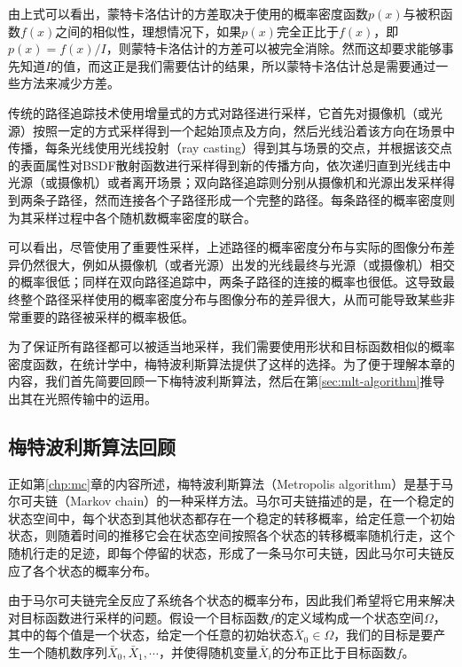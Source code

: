 \noindent 由上式可以看出，蒙特卡洛估计的方差取决于使用的概率密度函数$p(x)$与被积函数$f(x)$之间的相似性，理想情况下，如果$p(x)$完全正比于$f(x)$，即$p(x)=f(x)/I$，则蒙特卡洛估计的方差可以被完全消除。然而这却要求能够事先知道$I$的值，而这正是我们需要估计的结果，所以蒙特卡洛估计总是需要通过一些方法来减少方差。

传统的路径追踪技术使用增量式的方式对路径进行采样，它首先对摄像机（或光源）按照一定的方式采样得到一个起始顶点及方向，然后光线沿着该方向在场景中传播，每条光线使用光线投射（ray casting）得到其与场景的交点，并根据该交点的表面属性对BSDF散射函数进行采样得到新的传播方向，依次递归直到光线击中光源（或摄像机）或者离开场景；双向路径追踪则分别从摄像机和光源出发采样得到两条子路径，然而连接各个子路径形成一个完整的路径。每条路径的概率密度则为其采样过程中各个随机数概率密度的联合。

可以看出，尽管使用了重要性采样，上述路径的概率密度分布与实际的图像分布差异仍然很大，例如从摄像机（或者光源）出发的光线最终与光源（或摄像机）相交的概率很低；同样在双向路径追踪中，两条子路径的连接的概率也很低。这导致最终整个路径采样使用的概率密度分布与图像分布的差异很大，从而可能导致某些非常重要的路径被采样的概率极低。

为了保证所有路径都可以被适当地采样，我们需要使用形状和目标函数相似的概率密度函数，在统计学中，梅特波利斯算法提供了这样的选择。为了便于理解本章的内容，我们首先简要回顾一下梅特波利斯算法，然后在第\ref{sec:mlt-algorithm}推导出其在光照传输中的运用。



\subsection{梅特波利斯算法回顾}
正如第\ref{chp:mc}章的内容所述，梅特波利斯算法（Metropolis algorithm）是基于马尔可夫链（Markov chain）的一种采样方法。马尔可夫链描述的是，在一个稳定的状态空间中，每个状态到其他状态都存在一个稳定的转移概率，给定任意一个初始状态，则随着时间的推移它会在状态空间按照各个状态的转移概率随机行走，这个随机行走的足迹，即每个停留的状态，形成了一条马尔可夫链，因此马尔可夫链反应了各个状态的概率分布。

由于马尔可夫链完全反应了系统各个状态的概率分布，因此我们希望将它用来解决对目标函数进行采样的问题。假设一个目标函数$f$的定义域构成一个状态空间$\Omega$，其中的每个值是一个状态，给定一个任意的初始状态$\bar{X}_0\in\Omega$，我们的目标是要产生一个随机数序列$\bar{X}_0,\bar{X}_1,\cdots$，并使得随机变量$\bar{X}_i$的分布正比于目标函数$f$。

